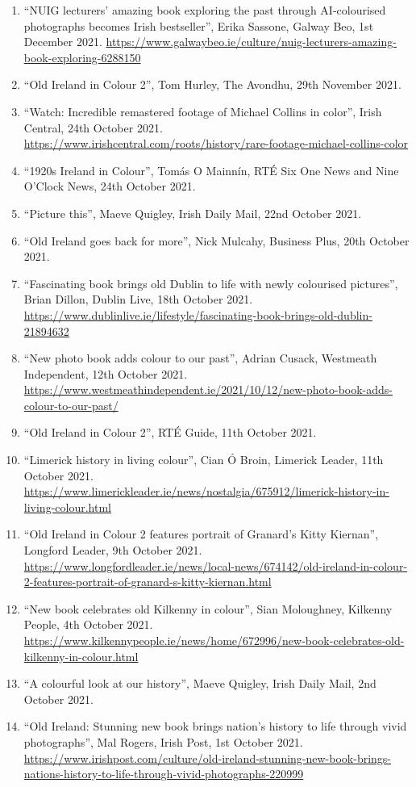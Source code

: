 \documentclass[10pt,a4paper]{res} %
\begin{document}
\begin{resume}
{\begin{enumerate}
\item ``NUIG lecturers' amazing book exploring the past through AI-colourised photographs becomes Irish bestseller'', Erika Sassone, Galway Beo, 1st December 2021. \url{https://www.galwaybeo.ie/culture/nuig-lecturers-amazing-book-exploring-6288150}
\item ``Old Ireland in Colour 2'', Tom Hurley, The Avondhu, 29th November 2021.
\item ``Watch: Incredible remastered footage of Michael Collins in color'', Irish Central, 24th October 2021. \url{https://www.irishcentral.com/roots/history/rare-footage-michael-collins-color}
\item ``1920s Ireland in Colour'', Tom\'{a}s O Mainn\'{i}n, RT\'{E} Six One News and Nine O'Clock News, 24th October 2021.
\item ``Picture this'', Maeve Quigley, Irish Daily Mail, 22nd October 2021.
\item ``Old Ireland goes back for more'', Nick Mulcahy, Business Plus, 20th October 2021.
\item ``Fascinating book brings old Dublin to life with newly colourised pictures'', Brian Dillon, Dublin Live, 18th October 2021. \url{https://www.dublinlive.ie/lifestyle/fascinating-book-brings-old-dublin-21894632}
\item ``New photo book adds colour to our past'', Adrian Cusack, Westmeath Independent, 12th October 2021. \url{https://www.westmeathindependent.ie/2021/10/12/new-photo-book-adds-colour-to-our-past/}
\item ``Old Ireland in Colour 2'', RT\'{E} Guide, 11th October 2021.
\item ``Limerick history in living colour'', Cian \'{O} Broin, Limerick Leader, 11th October 2021. \url{https://www.limerickleader.ie/news/nostalgia/675912/limerick-history-in-living-colour.html}
\item ``Old Ireland in Colour 2 features portrait of Granard's Kitty Kiernan'', Longford Leader, 9th October 2021. \url{https://www.longfordleader.ie/news/local-news/674142/old-ireland-in-colour-2-features-portrait-of-granard-s-kitty-kiernan.html}
\item ``New book celebrates old Kilkenny in colour'', Sian Moloughney, Kilkenny People, 4th October 2021. \url{https://www.kilkennypeople.ie/news/home/672996/new-book-celebrates-old-kilkenny-in-colour.html}
\item ``A colourful look at our history'', Maeve Quigley, Irish Daily Mail, 2nd October 2021.
\item ``Old Ireland: Stunning new book brings nation's history to life through vivid photographs'', Mal Rogers, Irish Post, 1st October 2021. \url{https://www.irishpost.com/culture/old-ireland-stunning-new-book-brings-nations-history-to-life-through-vivid-photographs-220999}

\end{enumerate}}
\end{resume}
\end{document}
